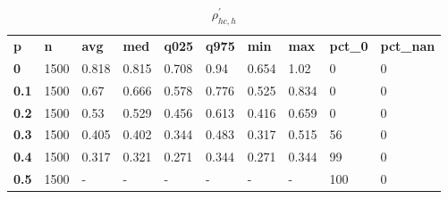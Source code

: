 \begin{table}[h]
 \centering 
\footnotesize
\caption{$\rho_{hc,h}^\prime $}
\label{tab:alphahch}
\begin{tabular}[h]{| l l l l l l l l l l|
    } \hline
\textbf{ p} & \textbf{ n} & \textbf{ avg} & \textbf{ med} & \textbf{ q025} & \textbf{ q975} & \textbf{ min} & \textbf{ max} & \textbf{ pct\_0} & \textbf{ pct\_nan}
           \\
  \textbf{  0} & 1500 & 0.818 & 0.815 & 0.708 &  0.94 & 0.654 &  1.02 &   0 & 0
           \\
  \textbf{0.1} & 1500 &  0.67 & 0.666 & 0.578 & 0.776 & 0.525 & 0.834 &   0 & 0
           \\
  \textbf{0.2} & 1500 &  0.53 & 0.529 & 0.456 & 0.613 & 0.416 & 0.659 &   0 & 0
           \\
  \textbf{0.3} & 1500 & 0.405 & 0.402 & 0.344 & 0.483 & 0.317 & 0.515 &  56 & 0
           \\
  \textbf{0.4} & 1500 & 0.317 & 0.321 & 0.271 & 0.344 & 0.271 & 0.344 &  99 & 0
           \\
  \textbf{0.5} & 1500 & - & - & - & - & - & - & 100 & 0
           \\
 \hline \end{tabular}
 \end{table}
